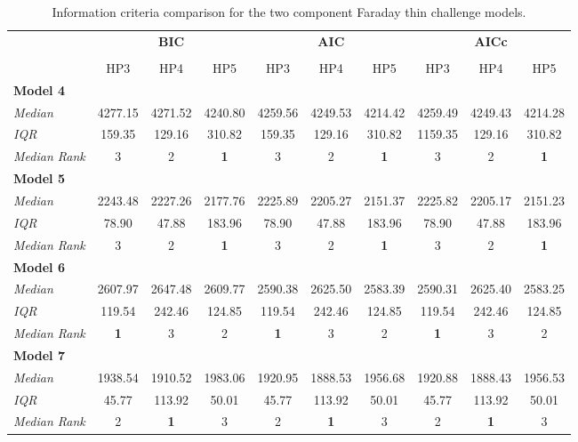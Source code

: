 \documentclass[fleqn,usenatbib]{mnras}
\begin{document}
\begin{table}
\caption{Information criteria comparison for the \cite{Sun_2015} two component Faraday thin challenge models. \label{tab:icdouble}}
    \centering
    \begin{tabular}{@{\extracolsep{3pt}}lccccccccc@{}}
    \hline
     & \multicolumn{3}{c}{\textbf{BIC}} & \multicolumn{3}{c}{\textbf{AIC}} & \multicolumn{3}{c}{\textbf{AICc}} \\
     \cline{2-4} \cline{5-7} \cline{8-10} \\
     & HP3 & HP4 & HP5 & HP3 & HP4 & HP5 & HP3 & HP4 & HP5 \\\hline
    \textbf{Model 4} & & & & & & & & & \\
    \emph{Median} & 4277.15 & 4271.52 & 4240.80 & 4259.56 & 4249.53 & 4214.42 & 4259.49 & 4249.43 & 4214.28 \\
    \emph{IQR} & 159.35 & 129.16 & 310.82 & 159.35 & 129.16 & 310.82 & 1159.35 & 129.16 & 310.82 \\
    \emph{Median Rank} & 3 & 2 & \textbf{1} & 3 & 2 & \textbf{1} & 3 & 2 & \textbf{1} \\\hline
    \textbf{Model 5} & & & & & & & & & \\
    \emph{Median} & 2243.48 & 2227.26 & 2177.76 & 2225.89 & 2205.27 & 2151.37 & 2225.82 & 2205.17 & 2151.23 \\
    \emph{IQR} & 78.90 & 47.88 & 183.96 & 78.90 & 47.88 & 183.96 & 78.90 & 47.88 & 183.96 \\
    \emph{Median Rank} & 3 & 2 & \textbf{1} & 3 & 2 & \textbf{1} & 3 & 2 & \textbf{1} \\\hline
    \textbf{Model 6} & & & & & & & & & \\
    \emph{Median} & 2607.97 & 2647.48 & 2609.77 & 2590.38 & 2625.50 & 2583.39 & 2590.31 & 2625.40 & 2583.25 \\
    \emph{IQR} & 119.54 & 242.46 & 124.85 & 119.54 & 242.46 & 124.85 & 119.54 & 242.46 & 124.85 \\
    \emph{Median Rank} & \textbf{1} & 3 & 2 & \textbf{1} & 3 & 2 & \textbf{1} & 3 & 2 \\\hline
    \textbf{Model 7} & & & & & & & & & \\
    \emph{Median} & 1938.54 & 1910.52 & 1983.06 & 1920.95 & 1888.53 & 1956.68 & 1920.88 & 1888.43 & 1956.53 \\
    \emph{IQR} & 45.77 & 113.92 & 50.01 & 45.77 & 113.92 & 50.01 & 45.77 & 113.92 & 50.01 \\
    \emph{Median Rank} & 2 & \textbf{1} & 3 & 2 & \textbf{1} & 3 & 2 & \textbf{1} & 3 \\\hline

\end{tabular}
\end{table}
\end{document}
